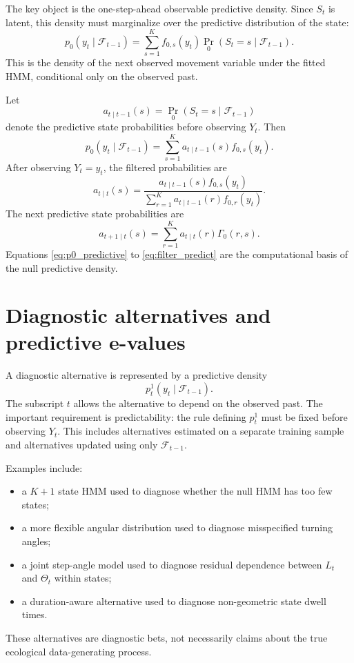\documentclass[11pt]{article}
\begin{document}
The key object is the one-step-ahead observable predictive density. Since $S_t$ is latent, this density must marginalize over the predictive distribution of the state:
\begin{equation}
\label{eq:p0_predictive}
p_0(y_t \mid \mathcal F_{t-1})
=
\sum_{s=1}^K
f_{0,s}(y_t)\Pr_0(S_t=s \mid \mathcal F_{t-1}).
\end{equation}
This is the density of the next observed movement variable under the fitted HMM, conditional only on the observed past.

Let
\begin{equation}
a_{t\mid t-1}(s) = \Pr_0(S_t=s \mid \mathcal F_{t-1})
\end{equation}
denote the predictive state probabilities before observing $Y_t$. Then
\begin{equation}
p_0(y_t \mid \mathcal F_{t-1}) = \sum_{s=1}^K a_{t\mid t-1}(s) f_{0,s}(y_t).
\end{equation}
After observing $Y_t=y_t$, the filtered probabilities are
\begin{equation}
\label{eq:filter_update}
a_{t\mid t}(s)
=
\frac{a_{t\mid t-1}(s) f_{0,s}(y_t)}
{\sum_{r=1}^K a_{t\mid t-1}(r) f_{0,r}(y_t)}.
\end{equation}
The next predictive state probabilities are
\begin{equation}
\label{eq:filter_predict}
a_{t+1\mid t}(s) = \sum_{r=1}^K a_{t\mid t}(r)\Gamma_0(r,s).
\end{equation}
Equations \eqref{eq:p0_predictive} to \eqref{eq:filter_predict} are the computational basis of the null predictive density.

\section{Diagnostic alternatives and predictive e-values}

A diagnostic alternative is represented by a predictive density
\begin{equation}
p_t^1(y_t \mid \mathcal F_{t-1}).
\end{equation}
The subscript $t$ allows the alternative to depend on the observed past. The important requirement is predictability: the rule defining $p_t^1$ must be fixed before observing $Y_t$. This includes alternatives estimated on a separate training sample and alternatives updated using only $\mathcal F_{t-1}$.

Examples include:
\begin{itemize}
\item a $K+1$ state HMM used to diagnose whether the null HMM has too few states;
\item a more flexible angular distribution used to diagnose misspecified turning angles;
\item a joint step-angle model used to diagnose residual dependence between $L_t$ and $\Theta_t$ within states;
\item a duration-aware alternative used to diagnose non-geometric state dwell times.
\end{itemize}
These alternatives are diagnostic bets, not necessarily claims about the true ecological data-generating process.
\end{document}
